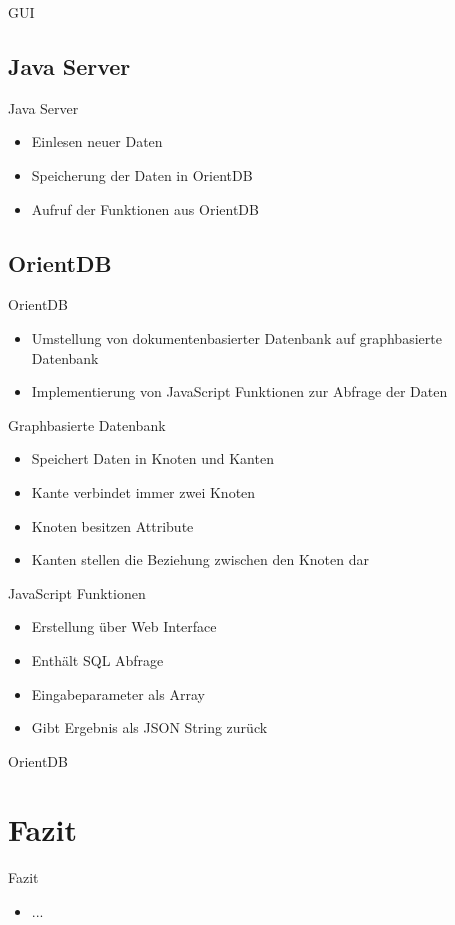 \documentclass[aspectratio=169]{beamer}
\begin{document}
\begin{frame}{GUI}
\end{frame}

\subsection{Java Server}

\begin{frame}{Java Server}
  \begin{itemize}
  	\item Einlesen neuer Daten
  	\item Speicherung der Daten in OrientDB
  	\item Aufruf der Funktionen aus OrientDB
  \end{itemize}
\end{frame}

\subsection{OrientDB}

\begin{frame}{OrientDB}
  \begin{itemize}
  	\item Umstellung von dokumentenbasierter Datenbank auf graphbasierte Datenbank
  	\item Implementierung von JavaScript Funktionen zur Abfrage der Daten
  \end{itemize}
\end{frame}

\begin{frame}{Graphbasierte Datenbank}
  \begin{itemize}
  	\item Speichert Daten in Knoten und Kanten
  	\item Kante verbindet immer zwei Knoten
  	\item Knoten besitzen Attribute
  	\item Kanten stellen die Beziehung zwischen den Knoten dar
  \end{itemize}
\end{frame}

\begin{frame}{JavaScript Funktionen}
  \begin{itemize}
  	\item Erstellung über Web Interface
  	\item Enthält SQL Abfrage
  	\item Eingabeparameter als Array
  	\item Gibt Ergebnis als JSON String zurück
  \end{itemize}
\end{frame}

\begin{frame}{OrientDB}
\end{frame}

\section{Fazit}

\begin{frame}{Fazit}
  \begin{itemize}
  	\item ...
  \end{itemize}
\end{frame}
\end{document}
